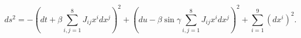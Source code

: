 \begin{equation}
\label{metn4M2}
ds^2 = - \left( dt + \beta \sum_{i,j=1}^{8} J_{ij} x^i dx^j \right)^2
+ \left( du - \beta \sin \gamma \sum_{i,j=1}^{8} J_{ij} x^i dx^j \right)^2 
+ \sum_{i=1}^9 (dx^i)^2. 
\end{equation}

